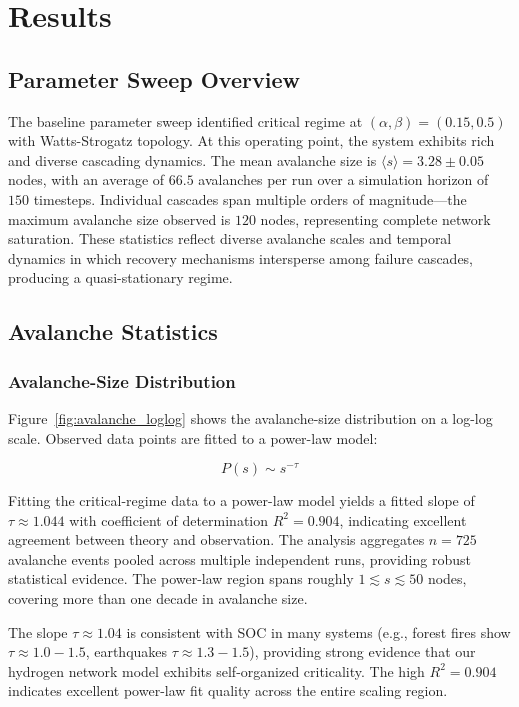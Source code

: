 \documentclass[12pt,a4paper,twoside]{report}
\begin{document}
\chapter{Results}

\section{Parameter Sweep Overview}

The baseline parameter sweep identified critical regime at $(\alpha, \beta) = (0.15, 0.5)$ with Watts-Strogatz topology. At this operating point, the system exhibits rich and diverse cascading dynamics. The mean avalanche size is $\langle s \rangle = 3.28 \pm 0.05$ nodes, with an average of $66.5$ avalanches per run over a simulation horizon of $150$ timesteps. Individual cascades span multiple orders of magnitude---the maximum avalanche size observed is $120$ nodes, representing complete network saturation. These statistics reflect diverse avalanche scales and temporal dynamics in which recovery mechanisms intersperse among failure cascades, producing a quasi-stationary regime.

\section{Avalanche Statistics}

\subsection{Avalanche-Size Distribution}

Figure~\ref{fig:avalanche_loglog} shows the avalanche-size distribution on a log-log scale. Observed data points are fitted to a power-law model:

\begin{equation}
P(s) \sim s^{-\tau}
\end{equation}

Fitting the critical-regime data to a power-law model yields a fitted slope of $\tau \approx 1.044$ with coefficient of determination $R^2 = 0.904$, indicating excellent agreement between theory and observation. The analysis aggregates $n = 725$ avalanche events pooled across multiple independent runs, providing robust statistical evidence. The power-law region spans roughly $1 \lesssim s \lesssim 50$ nodes, covering more than one decade in avalanche size.

The slope $\tau \approx 1.04$ is consistent with SOC in many systems (e.g., forest fires show $\tau \approx 1.0-1.5$, earthquakes $\tau \approx 1.3-1.5$), providing strong evidence that our hydrogen network model exhibits self-organized criticality. The high $R^2 = 0.904$ indicates excellent power-law fit quality across the entire scaling region.
\end{document}
